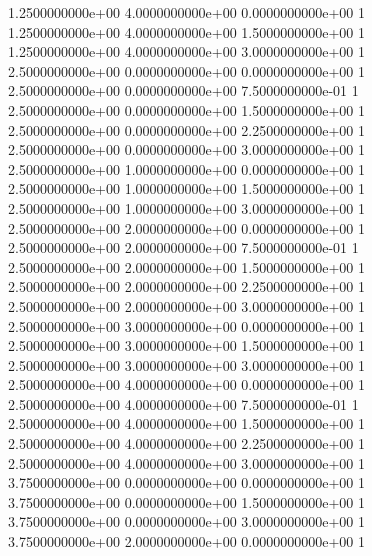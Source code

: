 \documentclass[12pt]{book}
\begin{document}
{1.2500000000e+00 4.0000000000e+00 0.0000000000e+00 1\\
1.2500000000e+00 4.0000000000e+00 1.5000000000e+00 1\\
1.2500000000e+00 4.0000000000e+00 3.0000000000e+00 1\\
2.5000000000e+00 0.0000000000e+00 0.0000000000e+00 1\\
2.5000000000e+00 0.0000000000e+00 7.5000000000e-01 1\\
2.5000000000e+00 0.0000000000e+00 1.5000000000e+00 1\\
2.5000000000e+00 0.0000000000e+00 2.2500000000e+00 1\\
2.5000000000e+00 0.0000000000e+00 3.0000000000e+00 1\\
2.5000000000e+00 1.0000000000e+00 0.0000000000e+00 1\\
2.5000000000e+00 1.0000000000e+00 1.5000000000e+00 1\\
2.5000000000e+00 1.0000000000e+00 3.0000000000e+00 1\\
2.5000000000e+00 2.0000000000e+00 0.0000000000e+00 1\\
2.5000000000e+00 2.0000000000e+00 7.5000000000e-01 1\\
2.5000000000e+00 2.0000000000e+00 1.5000000000e+00 1\\
2.5000000000e+00 2.0000000000e+00 2.2500000000e+00 1\\
2.5000000000e+00 2.0000000000e+00 3.0000000000e+00 1\\
2.5000000000e+00 3.0000000000e+00 0.0000000000e+00 1\\
2.5000000000e+00 3.0000000000e+00 1.5000000000e+00 1\\
2.5000000000e+00 3.0000000000e+00 3.0000000000e+00 1\\
2.5000000000e+00 4.0000000000e+00 0.0000000000e+00 1\\
2.5000000000e+00 4.0000000000e+00 7.5000000000e-01 1\\
2.5000000000e+00 4.0000000000e+00 1.5000000000e+00 1\\
2.5000000000e+00 4.0000000000e+00 2.2500000000e+00 1\\
2.5000000000e+00 4.0000000000e+00 3.0000000000e+00 1\\
3.7500000000e+00 0.0000000000e+00 0.0000000000e+00 1\\
3.7500000000e+00 0.0000000000e+00 1.5000000000e+00 1\\
3.7500000000e+00 0.0000000000e+00 3.0000000000e+00 1\\
3.7500000000e+00 2.0000000000e+00 0.0000000000e+00 1\\
}
\end{document}
